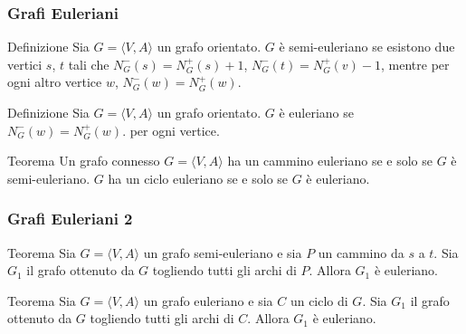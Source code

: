\begin{frame}[fragile]
\frametitle{Grafi Euleriani}
\begin{block}{Definizione}
Sia $G=\langle  V,A \rangle$ un grafo orientato.
$G$ è semi-euleriano se esistono due vertici $s$, $t$ tali che $N^{-}_{G}(s) =
N^{+}_{G}(s) +1$,  $N^{-}_{G}(t) = N^{+}_{G}(v) -1$, mentre per ogni altro
vertice $w$,  $N^{-}_{G}(w) =N^{+}_{G}(w)$.
\end{block}

\begin{block}{Definizione}
Sia $G=\langle  V,A \rangle$ un grafo orientato.
$G$ è euleriano se $N^{-}_{G}(w) =N^{+}_{G}(w)$. per ogni
vertice.
\end{block}

\begin{block}{Teorema}
Un grafo connesso $G=\langle  V,A \rangle$ ha un cammino euleriano se e solo se $G$ è semi-euleriano.
$G$ ha un ciclo euleriano se e solo se $G$ è euleriano.
\end{block}
\end{frame}


\begin{frame}[fragile]
\frametitle{Grafi Euleriani 2}

\begin{block}{Teorema}
Sia $G=\langle  V,A \rangle$ un grafo semi-euleriano e sia $P$ un  cammino da $s$ a $t$.
Sia $G_{1}$ il grafo ottenuto da $G$ togliendo tutti gli archi di $P$.
Allora $G_{1}$ è euleriano.
\end{block}

\begin{block}{Teorema}
Sia $G=\langle  V,A \rangle$ un grafo euleriano e sia $C$ un ciclo di $G$.
Sia $G_{1}$ il grafo ottenuto da $G$ togliendo tutti gli archi di $C$.
Allora $G_{1}$ è euleriano.
\end{block}
\end{frame}





